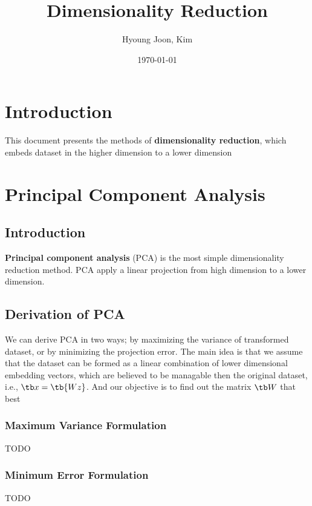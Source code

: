 \documentclass{article}
\title{Dimensionality Reduction}
\author{Hyoung Joon, Kim}
\date{\today}
\begin{document}
\maketitle
\tableofcontents
\newpage

\section{Introduction}
    This document presents the methods of \textbf{dimensionality reduction}, which embeds dataset in the higher dimension to a lower dimension

\section{Principal Component Analysis}
    \subsection{Introduction}
        \textbf{Principal component analysis} (PCA) is the most simple dimensionality reduction method. PCA apply a linear projection from high dimension
        to a lower dimension.
    \subsection{Derivation of PCA}
        We can derive PCA in two ways; by maximizing the variance of transformed dataset, or by minimizing the projection error. 
        The main idea is that we assume that the dataset can be formed as a linear combination of lower dimensional embedding vectors, which are believed to
        be managable then the original dataset, i.e., $\tb x = \tb{Wz}$.
        And our objective is to find out the matrix $\tb W$ that best 
        \subsubsection{Maximum Variance Formulation}
        TODO
        \subsubsection{Minimum Error Formulation}
        TODO
\end{document}
